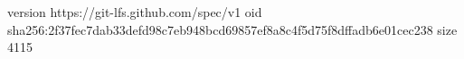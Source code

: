 version https://git-lfs.github.com/spec/v1
oid sha256:2f37fec7dab33defd98c7eb948bcd69857ef8a8c4f5d75f8dffadb6e01cec238
size 4115

